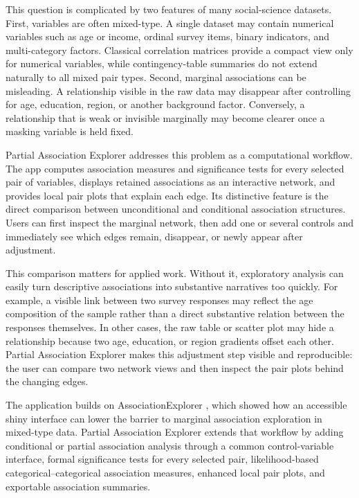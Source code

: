 \documentclass[11pt]{article}
\newcommand{\appname}{Partial Association Explorer}
\newcommand{\pkg}[1]{\textsf{#1}}
\begin{document}
This question is complicated by two features of many social-science datasets.
First, variables are often mixed-type. A single dataset may contain numerical
variables such as age or income, ordinal survey items, binary indicators, and
multi-category factors. Classical correlation matrices provide a compact view
only for numerical variables, while contingency-table summaries do not extend
naturally to all mixed pair types. Second, marginal associations can be
misleading. A relationship visible in the raw data may disappear after
controlling for age, education, region, or another background factor.
Conversely, a relationship that is weak or invisible marginally may become
clearer once a masking variable is held fixed.

\appname{} addresses this problem as a computational workflow. The app
computes association measures and significance tests for every selected pair of
variables, displays retained associations as an interactive network, and
provides local pair plots that explain each edge. Its distinctive feature is
the direct comparison between unconditional and conditional association
structures. Users can first inspect the marginal network, then add one or
several controls and immediately see which edges remain, disappear, or newly
appear after adjustment.

This comparison matters for applied work. Without it, exploratory analysis can
easily turn descriptive associations into substantive narratives too quickly.
For example, a visible link between two survey responses may reflect the age
composition of the sample rather than a direct substantive relation between the
responses themselves. In other cases, the raw table or scatter plot may hide a
relationship because two age, education, or region gradients offset each other.
\appname{} makes this adjustment step visible and reproducible: the user can
compare two network views and then inspect the pair plots behind the changing
edges.

The application builds on \pkg{AssociationExplorer}
\citep{SoeteweyHeuchenneClaesDescampe2026}, which showed how an accessible
\pkg{shiny} interface can lower the barrier to marginal association exploration
in mixed-type data. \appname{} extends that workflow by adding conditional or
partial association analysis through a common control-variable interface,
formal significance tests for every selected pair, likelihood-based
categorical--categorical association measures, enhanced local pair plots, and
exportable association summaries.
\end{document}
